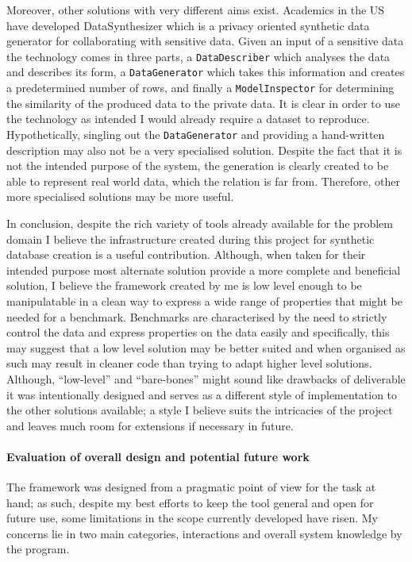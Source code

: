 Moreover, other solutions with very different aims exist. Academics in the US
have developed DataSynthesizer \cite{DataSynthesizer} which is a privacy
oriented synthetic data generator for collaborating with sensitive data. Given
an input of a sensitive data the technology comes in three parts, a
\lstinline{DataDescriber} which analyses the data and describes its form, a
\lstinline{DataGenerator} which takes this information and creates a
predetermined number of rows, and finally a \lstinline{ModelInspector} for
determining the similarity of the produced data to the private data. It is clear
in order to use the technology as intended I would already require a dataset to
reproduce. Hypothetically, singling out the \lstinline{DataGenerator} and
providing a hand-written description may also not be a very specialised
solution. Despite the fact that it is not the intended purpose of the system,
the generation is clearly created to be able to represent real world data, which
the  relation is far from. Therefore, other more specialised
solutions may be more useful.

In conclusion, despite the rich variety of tools already available for the
problem domain I believe the infrastructure created during this project for
synthetic database creation is a useful contribution. Although, when taken for
their intended purpose most alternate solution provide a more complete and
beneficial solution, I believe the framework created by me is low level enough
to be manipulatable in a clean way to express a wide range of properties that
might be needed for a benchmark. Benchmarks are characterised by the need to
strictly control the data and express properties on the data easily and
specifically, this may suggest that a low level solution may be better suited
and when organised as such may result in cleaner code than trying to adapt
higher level solutions. Although, ``low-level'' and ``bare-bones''
might sound like drawbacks of deliverable it was intentionally designed and serves
as a different style of implementation to the other solutions available; a style
I believe suits the intricacies of the project and leaves much room for
extensions if necessary in future.


\paragraph{Evaluation of overall design and potential future work} The framework
was designed from a pragmatic point of view for the task at hand; as such,
despite my best efforts to keep the tool general and open for future use, some
limitations in the scope currently developed have risen. My concerns lie in two
main categories, interactions and overall system knowledge by the program.

